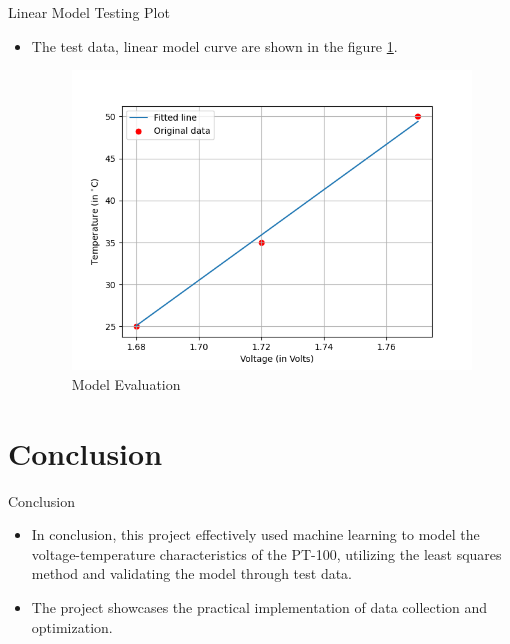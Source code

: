 \documentclass[10pt]{beamer}
\begin{document}
\begin{frame}{Linear Model Testing Plot}
\begin{itemize}
\item The test data, linear model curve are shown in the figure \ref{fig:3}.

\begin{figure}[ht]
    \centering
    \includegraphics[scale = 0.48]{figs/Test.png}
    \caption{Model Evaluation}
    \label{fig:3}
\end{figure}
\end{itemize}
\end{frame}

\section{Conclusion}
\begin{frame}{Conclusion}
\begin{itemize}
\item In conclusion, this project effectively used machine learning to model the voltage-temperature characteristics of the PT-100, utilizing the least squares method and validating the model through test data. \vspace{0.25cm}
\item The project showcases the practical implementation of data collection and optimization.
\end{itemize}
\end{frame}
\end{document}

